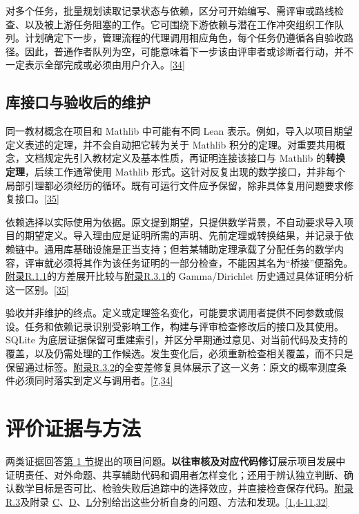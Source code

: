 对多个任务，批量规划读取记录状态与依赖，区分可开始编写、需评审或路线检查、以及被上游任务阻塞的工作。它可围绕下游依赖与潜在工作冲突组织工作队列。计划确定下一步，管理流程的代理调用相应角色，每个任务仍遵循各自验收路径。因此，普通作者队列为空，可能意味着下一步该由评审者或诊断者行动，并不一定表示全部完成或必须由用户介入。\hyperlink{ref-34}{\mbox{[34]}}

\subsection[库接口与验收后的维护]{\texorpdfstring{\protect\hypertarget{section-1-5}{}库接口与验收后的维护}{库接口与验收后的维护}}
同一教材概念在项目和 Mathlib 中可能有不同 Lean 表示。例如，导入以项目期望定义表述的定理，并不会自动把它转为关于 Mathlib 积分的定理。对重要共用概念，文档规定先引入教材定义及基本性质，再证明连接该接口与 Mathlib 的\textbf{转换定理}，后续工作通常使用 Mathlib 形式。这针对反复出现的数学接口，并非每个局部引理都必须经历的循环。既有可运行文件应予保留，除非具体复用问题要求修复接口。\hyperlink{ref-35}{\mbox{[35]}}

依赖选择以实际使用为依据。原文提到期望，只提供数学背景，不自动要求导入项目的期望定义。导入理由应是证明所需的声明、先前定理或转换结果，并记录于依赖链中。通用库基础设施是正当支持；但若某辅助定理承载了分配任务的数学内容，评审就必须将其作为该任务证明的一部分检查，不能因其名为“桥接”便豁免。\href{zh-appendix.pdf\#r1-1}{附录R.1.1}的方差展开比较与\href{zh-appendix.pdf\#r3-1}{附录R.3.1}的 Gamma/Dirichlet 历史通过具体证明分析这一区别。\hyperlink{ref-35}{\mbox{[35]}}

验收并非维护的终点。定义或定理签名变化，可能要求调用者提供不同参数或假设。任务和依赖记录识别受影响工作，构建与评审检查修改后的接口及其使用。SQLite 为底层证据保留可重建索引，并区分早期通过意见、对当前代码及支持的覆盖，以及仍需处理的工作候选。发生变化后，必须重新检查相关覆盖，而不只是保留通过标签。\href{zh-appendix.pdf\#r3-2}{附录R.3.2}的全变差修复具体展示了这一义务：原文的概率测度条件必须同时落实到定义与调用者。\hyperlink{ref-7}{\mbox{[7,34]}}

\section[评价证据与方法]{\texorpdfstring{\protect\hypertarget{section-2}{}评价证据与方法}{评价证据与方法}}
两类证据回答\hyperlink{evaluation-questions}{第 1 节}提出的项目问题。\textbf{以往审核及对应代码修订}展示项目发展中证明责任、对外命题、共享辅助代码和调用者怎样变化；还用于辨认独立判断、确认数学目标是否可比、检验失败后追踪中的选择效应，并直接检查保存代码。\href{zh-appendix.pdf\#r3}{附录R.3}及附录 \href{zh-appendix.pdf\#appendix-c}{C}、\href{zh-appendix.pdf\#appendix-d}{D}、\href{zh-appendix.pdf\#appendix-l}{L}分别给出这些分析自身的问题、方法和发现。\hyperlink{ref-1}{\mbox{[1,4-11,32]}}


